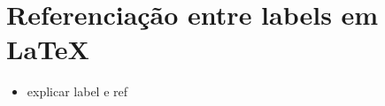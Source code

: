 \section{Referenciação entre labels em \LaTeX}
\begin{frame}[fragile]
\begin{block}{}
\begin{itemize}
 \item explicar label e ref
\end{itemize}
\end{block}
\end{frame}
